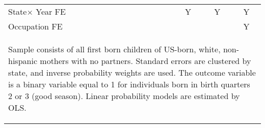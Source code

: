 \begin{table}[htbp]
{\begin{tabular}{l*{6}{c}}
State$\times$ Year FE&&&&Y&Y&Y\\ Occupation FE &&&&&&Y\\ \bottomrule
\multicolumn{7}{p{13.9cm}}{\begin{footnotesize}Sample consists of all
first born children of US-born, white, non-hispanic mothers with no
partners.  Standard errors are clustered by state, and inverse
probability weights are used.  The outcome variable is a binary
variable equal to 1 for individuals born in birth quarters 2 or 3
(good season). Linear probability models are estimated by OLS.
\end{footnotesize}}\end{tabular}}\end{table}
